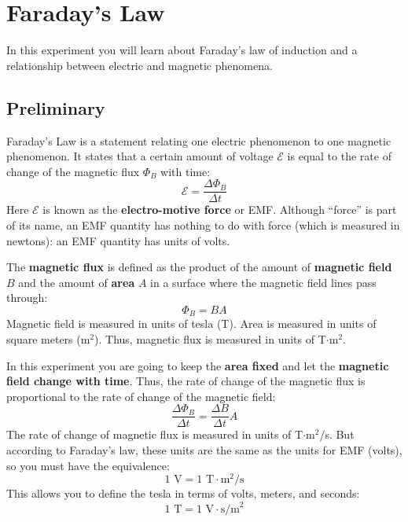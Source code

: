 \setcounter{chapter}{3}
\chapter{Faraday's Law}
In this experiment you will learn about Faraday's law of induction and a relationship between electric and magnetic phenomena.
\section{Preliminary}
Faraday's Law is a statement relating one electric phenomenon to one magnetic phenomenon. It states that a certain amount of voltage $\mathcal{E}$ is equal to the rate of change of the magnetic flux $\Phi_{B}$ with time:
\begin{equation}
	\mathcal{E} = \frac{\Delta \Phi_{B}}{\Delta t}
	\label{eq.04.faradays.law}
\end{equation}
Here $\mathcal{E}$ is known as the \textbf{electro-motive force} or EMF. Although ``force'' is part of its name, an EMF quantity has nothing to do with force (which is measured in newtons): an EMF quantity has units of volts.

The \textbf{magnetic flux} is defined as the product of the amount of \textbf{magnetic field} $B$ and the amount of \textbf{area} $A$ in a surface where the magnetic field lines pass through:
\begin{equation}
	\Phi_{B} = B A
\end{equation}
Magnetic field is measured in units of tesla (T). Area is measured in units of square meters (m$^{2}$). Thus, magnetic flux is measured in units of T$\cdot$m$^{2}$.

In this experiment you are going to keep the \textbf{area fixed} and let the \textbf{magnetic field change with time}. Thus, the rate of change of the magnetic flux is proportional to the rate of change of the magnetic field:
\begin{equation}
	\frac{\Delta \Phi_{B}}{\Delta t} = \frac{\Delta B}{\Delta t} A
	\label{eq.04.flux.rate}
\end{equation}
The rate of change of magnetic flux is measured in units of T$\cdot$m$^{2}$/s. But according to Faraday's law, these units are the same as the units for EMF (volts), so you must have the equivalence:
\begin{equation}
	1 \text{ V} = 1 \text{ T} \cdot \text{m}^{2}\text{/s}
\end{equation}
This allows you to define the tesla in terms of volts, meters, and seconds:
\begin{equation}
	1 \text{ T} = 1 \text{ V} \cdot \text{s/m}^2
\end{equation}


